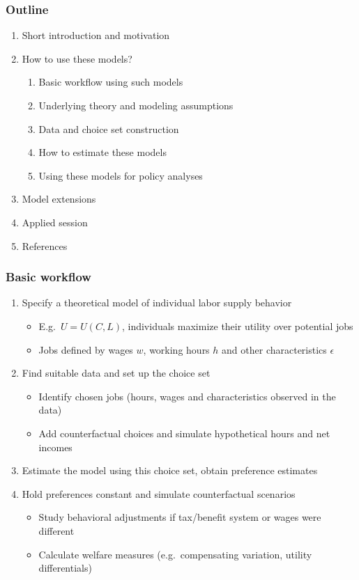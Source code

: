 \documentclass[handout,intlimits]{beamer}
\begin{document}
\begin{frame}
\frametitle{Outline}
\begin{enumerate}
	\item Short introduction and motivation
	\bigskip
	\item How to use these models?
	\begin{enumerate}
		\item Basic workflow using such models
		\smallskip
		\item Underlying theory and modeling assumptions
		\smallskip
		\item Data and choice set construction
		\smallskip
		\item How to estimate these models
		\smallskip
		\item Using these models for policy analyses
	\end{enumerate}
	\bigskip
	\item Model extensions
	\bigskip
	\item Applied session
	\bigskip
	\item References
\end{enumerate}
\end{frame}

\begin{frame}
\frametitle{Basic workflow}
\begin{enumerate}
	\item Specify a theoretical model of individual labor supply behavior
	\begin{itemize}
		\item E.g.\ $U=U\left(C,L\right)$, individuals maximize their utility over potential jobs
		\smallskip
		\item Jobs defined by wages $w$, working hours $h$ and other characteristics $\epsilon$
	\end{itemize}
	\bigskip
	\item Find suitable data and set up the choice set
	\begin{itemize}
		\item Identify chosen jobs (hours, wages and characteristics observed in the data)
		\smallskip
		\item Add counterfactual choices and simulate hypothetical hours and net incomes
	\end{itemize}
	\bigskip
	\item Estimate the model using this choice set, obtain preference estimates
	\bigskip
	\item Hold preferences constant and simulate counterfactual scenarios
	\begin{itemize}
		\item Study behavioral adjustments if tax/benefit system or wages were different
		\smallskip
		\item Calculate welfare measures (e.g.\ compensating variation, utility differentials)
	\end{itemize}
\end{enumerate}
\end{frame}
\end{document}
